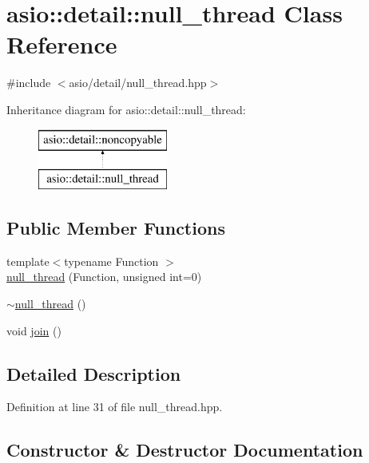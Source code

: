 \hypertarget{classasio_1_1detail_1_1null__thread}{}\section{asio\+:\+:detail\+:\+:null\+\_\+thread Class Reference}
\label{classasio_1_1detail_1_1null__thread}


{\ttfamily \#include $<$asio/detail/null\+\_\+thread.\+hpp$>$}

Inheritance diagram for asio\+:\+:detail\+:\+:null\+\_\+thread\+:\begin{figure}[H]
\begin{center}
\leavevmode
\includegraphics[height=2.000000cm]{classasio_1_1detail_1_1null__thread}
\end{center}
\end{figure}
\subsection*{Public Member Functions}
\begin{DoxyCompactItemize}
\item 
{\footnotesize template$<$typename Function $>$ }\\\hyperlink{classasio_1_1detail_1_1null__thread_af17a545fb3bfa54bb1ce5e44fac5d8cb}{null\+\_\+thread} (Function, unsigned int=0)
\item 
\hyperlink{classasio_1_1detail_1_1null__thread_ae23a0a6b8b148c1e4c241270de472409}{$\sim$null\+\_\+thread} ()
\item 
void \hyperlink{classasio_1_1detail_1_1null__thread_ab6aa75c67e7b1fea5783591fda3286f5}{join} ()
\end{DoxyCompactItemize}


\subsection{Detailed Description}


Definition at line 31 of file null\+\_\+thread.\+hpp.



\subsection{Constructor \& Destructor Documentation}
\hypertarget{classasio_1_1detail_1_1null__thread_af17a545fb3bfa54bb1ce5e44fac5d8cb}{}
